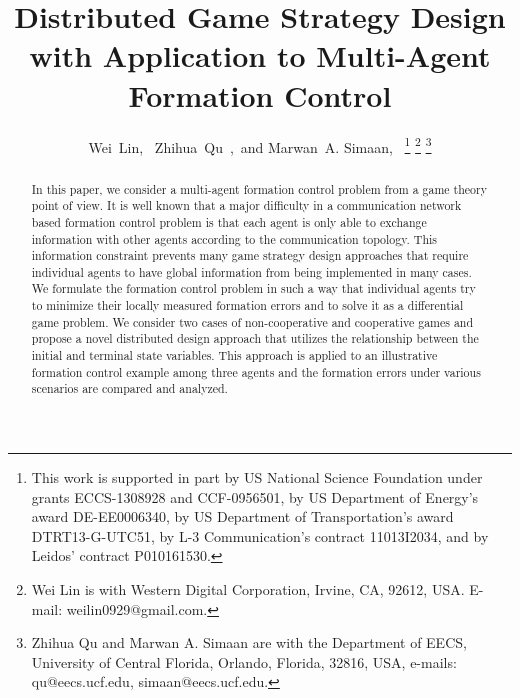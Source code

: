 \documentclass[10pt,doublecolumn]{IEEEtran}  %
\begin{document}
\title{\LARGE \bf
Distributed Game Strategy Design with Application to Multi-Agent Formation Control}


\author{Wei~Lin,~
        Zhihua~Qu~,~and
        Marwan~A. Simaan,~
\thanks{This work is supported in part by US National Science Foundation under grants ECCS-1308928 and CCF-0956501, by US Department of Energy’s award DE-EE0006340, by US Department of Transportation’s award DTRT13-G-UTC51, by L-3 Communication’s contract 11013I2034, and by Leidos’ contract P010161530.}%
\thanks{Wei Lin is with Western Digital Corporation, Irvine, CA, 92612, USA. E-mail: weilin0929@gmail.com.}
\thanks{Zhihua Qu and Marwan A. Simaan are with the Department of EECS, University of Central Florida, Orlando, Florida, 32816, USA, e-mails: qu@eecs.ucf.edu, simaan@eecs.ucf.edu.}%
%
}



\maketitle

\IEEEpeerreviewmaketitle

\begin{abstract}
In this paper, we consider a multi-agent formation control problem from a game theory point of view. It is well known that a major difficulty in a communication network based formation control problem is that each agent is only able to exchange information with other agents according to the communication topology. This information constraint prevents many game strategy design approaches that require individual agents to have global information from being implemented in many cases. We formulate the formation control problem in such a way that individual agents try to minimize their locally measured formation errors and to solve it as a differential game problem. We consider two cases of non-cooperative and cooperative games and propose a novel distributed design approach that utilizes the relationship between the initial and terminal state variables. This approach is applied to an illustrative formation control example among three agents and the formation errors under various scenarios are compared and analyzed.
\end{abstract}
\end{document}
